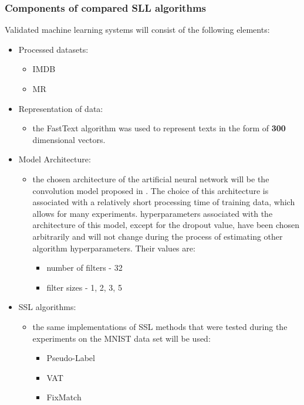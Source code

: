 \documentclass[12pt]{article}
\theoremstyle{definition}
\DeclareRobustCommand{\[}{\begin{equation}}
\DeclareRobustCommand{\]}{\end{equation}}
\begin{document}
\subsubsection{Components of compared SLL algorithms}
Validated machine learning systems will consist of the following elements:
\begin{itemize}
   \item Processed datasets:
   \begin{itemize}
     \item  IMDB \cite{IMDB}
     \item  MR \cite{MR}
   \end{itemize}
   \item Representation of data:
   \begin{itemize}
     \item  the FastText algorithm was used to represent texts in the form of \textbf{300} dimensional vectors.  \cite{FastText}
   \end{itemize}
   \item Model Architecture:
   \begin{itemize}
     \item   the chosen architecture of the artificial neural network will be the convolution model proposed in \cite{Convolution}. The choice of this architecture is associated with a relatively short processing time of training data, which allows for many experiments. 
     \The hyperparameters associated with the architecture of this model, except for the dropout value, have been chosen arbitrarily and will not change during the process of estimating other algorithm hyperparameters. Their values are:
      \begin{itemize}
      \item number of filters - 32
      \item filter sizes - 1, 2, 3, 5
      \end{itemize}
   \end{itemize}
   \item SSL algorithms:
    \begin{itemize}
    \item the same implementations of SSL methods that were tested during the experiments on the MNIST data set will be used:
        \begin{itemize}
            \item Pseudo-Label
            \item VAT
            \item FixMatch
         \end{itemize}
    \end{itemize}
\end{itemize}
\end{document}
